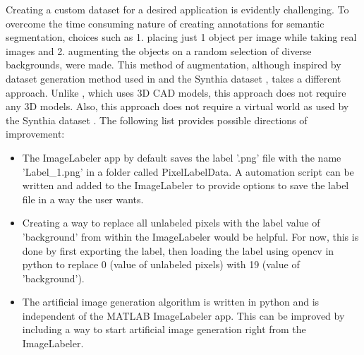 Creating a custom dataset for a desired application is evidently challenging. To overcome the time consuming nature of creating annotations for semantic segmentation, choices such as 1. placing just 1 object per image while taking real images and 2. augmenting the objects on a random selection of diverse backgrounds, were made. This method of augmentation, although inspired by dataset generation method used in \cite{DBLP:journals/corr/abs-1709-00849} and the Synthia dataset \cite{RosCVPR16}, takes a different approach. Unlike \cite{DBLP:journals/corr/abs-1709-00849}, which uses 3D CAD models, this approach does not require any 3D models. Also, this approach does not require a virtual world as used by the Synthia dataset \cite{RosCVPR16}. 
The following list provides possible directions of improvement:
	\begin{itemize}
		\item The ImageLabeler app by default saves the label '.png' file with the name 'Label\_1.png' in a folder called PixelLabelData. A automation script can be written and added to the ImageLabeler to provide options to save the label file in a way the user wants.
		\item Creating a way to replace all unlabeled pixels with the label value of 'background' from within the ImageLabeler would be helpful. For now, this is done by first exporting the label, then loading the label using opencv in python to replace 0 (value of unlabeled pixels) with 19 (value of 'background').
		\item The artificial image generation algorithm is written in python and is independent of the MATLAB ImageLabeler app. This can be improved by including a way to start artificial image generation right from the ImageLabeler.
	\end{itemize}
